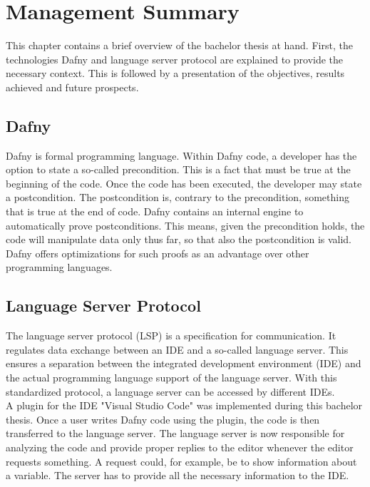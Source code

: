 \section{Management Summary}
\label{section:management_summary}

This chapter contains a brief overview of the bachelor thesis at hand.
First, the technologies Dafny and language server protocol are explained to provide the necessary context.
This is followed by a presentation of the objectives, results achieved and future prospects.

\subsection{Dafny}
\label{section:management_summary:dafny}
Dafny is formal programming language.
Within Dafny code, a developer has the option to state a so-called precondition.
This is a fact that must be true at the beginning of the code.
Once the code has been executed, the developer may state a postcondition.
The postcondition is, contrary to the precondition, something that is true at the end of code.
Dafny contains an internal engine to automatically prove postconditions.
This means, given the precondition holds, the code will manipulate data only thus far, so that also the postcondition is valid.
Dafny offers optimizations for such proofs as an advantage over other programming languages.

\subsection{Language Server Protocol}
The language server protocol (LSP) is a specification for communication. 
It regulates data exchange between an IDE and a so-called language server.
This ensures a separation between the integrated development environment (IDE) and the actual programming language support of the language server. 
With this standardized protocol, a language server can be accessed by different IDEs. \\

A plugin for the IDE "Visual Studio Code" was implemented during this bachelor thesis. 
Once a user writes Dafny code using the plugin, the code is then transferred to the language server.
The language server is now responsible for analyzing the code and provide proper replies to the editor whenever the editor requests something.
A request could, for example, be to show information about a variable.
The server has to provide all the necessary information to the IDE.\\

